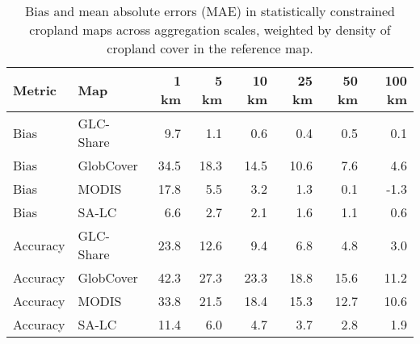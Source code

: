 \begin{longtable}{llrrrrrr}
\caption{Bias and mean absolute errors (MAE) in statistically constrained cropland maps across aggregation scales, weighted by density of cropland cover in the reference map. } \\ 
  \hline
Metric & Map & 1 km & 5 km & 10 km & 25 km & 50 km & 100 km \\ 
  \hline
Bias & GLC-Share & 9.7 & 1.1 & 0.6 & 0.4 & 0.5 & 0.1 \\ 
  Bias & GlobCover & 34.5 & 18.3 & 14.5 & 10.6 & 7.6 & 4.6 \\ 
  Bias & MODIS & 17.8 & 5.5 & 3.2 & 1.3 & 0.1 & -1.3 \\ 
  Bias & SA-LC & 6.6 & 2.7 & 2.1 & 1.6 & 1.1 & 0.6 \\ 
  Accuracy & GLC-Share & 23.8 & 12.6 & 9.4 & 6.8 & 4.8 & 3.0 \\ 
  Accuracy & GlobCover & 42.3 & 27.3 & 23.3 & 18.8 & 15.6 & 11.2 \\ 
  Accuracy & MODIS & 33.8 & 21.5 & 18.4 & 15.3 & 12.7 & 10.6 \\ 
  Accuracy & SA-LC & 11.4 & 6.0 & 4.7 & 3.7 & 2.8 & 1.9 \\ 
   \hline
\hline
\end{longtable}
